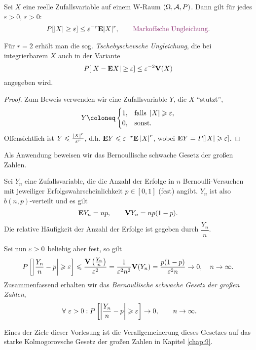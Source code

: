 \begin{prop}
\label{prop:4.7}
Sei $X$ eine reelle Zufallsvariable auf einem W-Raum $(\Omega, {\cal
A},P)$.
Dann gilt für jedes $\varepsilon >0$, $r>0$:
\begin{align*}
P[| X | \geq \varepsilon ] \leq \varepsilon ^ {-r} \E | X | ^ {r},\qquad
\text{\emph{Markoffsche Ungleichung}}.
\end{align*}

Für $r=2$ erhält man die sog. \emph{Tschebyschevsche Ungleichung}, die bei
integrierbarem $X$ auch in der Variante
\begin{align*}
P[| X-\textbf{E} X | \geq \varepsilon ] \leq \varepsilon ^ {-2} \textbf{V}(X)
\end{align*}
angegeben wird.\fishhere
\end{prop}
\begin{proof}
Zum Beweis verwenden wir eine Zufallsvariable $Y$, die $X$ ``stutzt'',
\begin{align*}
Y \defl
\begin{cases}
1, & \text{falls } \abs{X} \ge \ep,\\
0, & \text{sonst}.
\end{cases}
\end{align*}
Offensichtlich ist $Y\leqslant \frac{\left|X\right|^r}{\varepsilon^r}$, d.h. $\textbf{E} Y \leqslant \varepsilon^{-r}\textbf{E}
\left|X\right|^r$, wobei $\textbf{E} Y = P[\left|X\right|\geqslant \varepsilon]$.\qedhere
\end{proof}

Als Anwendung beweisen wir das Bernoullische schwache Gesetz der großen Zahlen. 

\begin{bsp}
Sei $Y_n$ eine Zufallsvariable, die die Anzahl der Erfolge in $n$
Bernoulli-Versuchen mit jeweiliger Erfolgswahrscheinlichkeit $p\in[0,1]$ (fest)
angibt. $Y_n$ ist also $b(n,p)$-verteilt und es gilt
\begin{align*}
\textbf{E} Y_n = np,\qquad \textbf{V} Y_n = np(1-p).
\end{align*}
Die relative Häufigkeit der Anzahl der Erfolge ist gegeben durch
$\dfrac{Y_n}{n}$.

Sei nun $\varepsilon > 0$ beliebig aber fest, so gilt
\begin{align*}
P\left[\left|\frac{Y_n}{n}-p\right|\geqslant \varepsilon\right] \leqslant \frac{\textbf{V}
\left(\frac{Y_n}{n}\right)}{\varepsilon^2} = \frac{1}{\varepsilon^2n^2}\textbf{V}(Y_n) =
\frac{p(1-p)}{\varepsilon^2n}\to0,\quad n\to\infty.
\end{align*}
Zusammenfassend erhalten wir das \emph{Bernoullische schwache Gesetz der großen
Zahlen},
\begin{align*}
\forall \ep > 0 : P\left[ \abs{\frac{Y_n}{n} -p} \ge \ep \right] \to 0,\qquad
n\to\infty.
\end{align*}

Eines der Ziele dieser Vorlesung ist die Verallgemeinerung dieses Gesetzes auf
das starke Kolmogorovsche Gesetz der großen Zahlen in Kapitel
\ref{chap:9}.\bsphere
\end{bsp}

